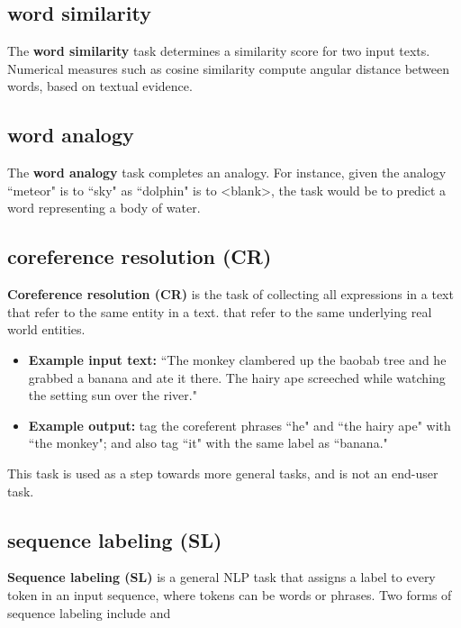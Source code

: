 \subsection{word similarity} \label{nlptask:wordsimilarity}

The \textbf{word similarity} task determines a similarity score for two input texts. Numerical measures such as cosine similarity compute angular distance between words, based on textual evidence. 


\subsection{word analogy} \label{nlptask:wordanalogy}

The \textbf{word analogy} task completes an analogy. For instance, given the analogy ``meteor" is to ``sky" as ``dolphin" is to <blank>, the task would be to predict a word representing a body of water. 


\subsection{coreference resolution (CR)} \label{nlptask:coreferenceresolutionCR}

\textbf{Coreference resolution (CR)} is the task of collecting all expressions in a text that refer to the same entity in a text.  that refer to the same underlying real world entities. 

\begin{itemize}
    \item \textbf{Example input text: } ``The monkey clambered up the baobab tree and he grabbed a banana and ate it there. The hairy ape screeched while watching the setting sun over the river."
    
    \item \textbf{Example output: } tag the coreferent phrases ``he" and ``the hairy ape" with  ``the monkey"; and also tag ``it" with the same label as ``banana." 
    
\end{itemize}

This task is used as a step towards more general tasks, and is not an end-user task. 

\subsection{sequence labeling (SL)} \label{nlptask:sequencelabelingSL}

\textbf{Sequence labeling (SL)} is a general NLP task that assigns a label to every token in an input sequence, where tokens can be words or phrases. Two forms of sequence labeling include  and 

